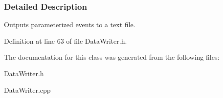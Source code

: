 \subsubsection{Detailed Description}
Outputs parameterized events to a text file. 

Definition at line 63 of file DataWriter.h.



The documentation for this class was generated from the following files:\begin{DoxyCompactItemize}
\item 
DataWriter.h\item 
DataWriter.cpp\end{DoxyCompactItemize}
